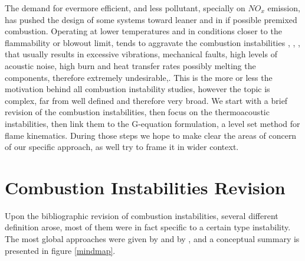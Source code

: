 The demand for evermore efficient, and less pollutant, specially on $NO_x$ emission, has pushed the design of some systems toward leaner and in if possible premixed combustion. Operating at lower temperatures and in conditions closer to the flammability or blowout limit, tends to aggravate the combustion instabilities \cite{candel}, \cite{lefebvre}, \cite{ghoniem}, that usually results in excessive vibrations, mechanical faults, high levels of acoustic noise, high burn and heat transfer rates possibly melting the components, therefore extremely undesirable,\cite{prateep}.
This is the more or less the motivation behind all combustion instability studies, however the topic is complex, far from well defined and therefore very broad.  We start with a brief revision of the combustion instabilities, then focus on the thermoacoustic instabilities, then link them to the G-equation formulation, a level set method for flame kinematics. During those steps we hope to make clear the areas of concern of our specific approach, as well try to frame it in wider context.



\newpage 
\section{Combustion Instabilities Revision}
Upon the bibliographic revision of combustion instabilities, several different definition arose, most of them were in fact specific to a certain type instability. The most global approaches were given by \cite{candel} and by \cite{barrere},  and a conceptual summary is presented in figure \ref{mindmap}.

